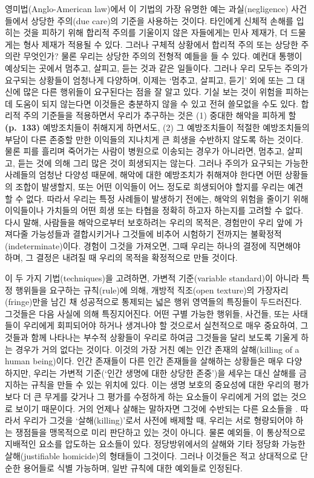 영미법(Anglo-American law)에서 이 기법의 가장 유명한 예는
과실(negligence) 사건들에서 상당한 주의(due care)의 기준을 사용하는
것이다. 타인에게 신체적 손해를 입히는 것을 피하기 위해 합리적 주의를
기울이지 않은 자들에게는 민사 제재가, 더 드물게는 형사 제재가 적용될 수
있다. 그러나 구체적 상황에서 합리적 주의 또는 상당한 주의란 무엇인가?
물론 우리는 상당한 주의의 전형적 예들을 들 수 있다. 예컨대 통행이
예상되는 곳에서 멈추고, 살피고, 듣는 것과 같은 일들이다. 그러나 우리
모두는 주의가 요구되는 상황들이 엄청나게 다양하며, 이제는 ‘멈추고,
살피고, 듣기’ 외에 또는 그 대신에 많은 다른 행위들이 요구된다는 점을 잘
알고 있다. 기실 보는 것이 위험을 피하는 데 도움이 되지 않는다면 이것들은
충분하지 않을 수 있고 전혀 쓸모없을 수도 있다. 합리적 주의 기준들을
적용하면서 우리가 추구하는 것은 (1) 중대한 해악을 피하게 할
\textbf{(p.~133)} 예방조치들이 취해지게 하면서도, (2) 그 예방조치들이
적절한 예방조치들의 부담이 다른 존중할 만한 이익들의 지나치게 큰 희생을
수반하지 않도록 하는 것이다. 물론 피를 흘리며 죽어가는 사람이 병원으로
이송되는 경우가 아니라면, 멈추고, 살피고, 듣는 것에 의해 그리 많은 것이
희생되지는 않는다. 그러나 주의가 요구되는 가능한 사례들의 엄청난 다양성
때문에, 해악에 대한 예방조치가 취해져야 한다면 어떤 상황들의 조합이
발생할지, 또는 어떤 이익들이 어느 정도로 희생되어야 할지를 우리는
 예견할 수 없다. 따라서 우리는 특정 사례들이
발생하기 전에는, 해악의 위험을 줄이기 위해 이익들이나 가치들의 어떤 희생
또는 타협을 정확히 하고자 하는지를 고려할 수 없다. 다시 말해, 사람들을
해악으로부터 보호하려는 우리의 목적은, 경험만이 우리 앞에 가져다줄
가능성들과 결합시키거나 그것들에 비추어 시험하기 전까지는
불확정적(indeterminate)이다. 경험이 그것을 가져오면, 그때 우리는 하나의
결정에 직면해야 하며, 그 결정은 내려질 때 우리의 목적을  확정적으로 만들 것이다.

이 두 가지 기법(techniques)을 고려하면, 가변적 기준(variable standard)이
아니라 특정 행위들을 요구하는 규칙(rule)에 의해, 개방적 직조(open
texture)의 가장자리(fringe)만을 남긴 채 
성공적으로 통제되는 넓은 행위 영역들의 특징들이 두드러진다. 그것들은
다음 사실에 의해 특징지어진다. 어떤 구별 가능한 행위들, 사건들, 또는
사태들이 우리에게 회피되어야 하거나 생겨나야 할 것으로서 실천적으로 매우
중요하여, 그것들과 함께 나타나는 부수적 상황들이 우리로 하여금 그것들을
달리 보도록 기울게 하는 경우가 거의 없다는 것이다. 이것의 가장 거친 예는
인간 존재의 살해(killing of a human being)이다. 인간 존재들이 다른 인간
존재들을 살해하는 상황들은 매우 다양하지만, 우리는 가변적 기준(‘인간
생명에 대한 상당한 존중’)을 세우는 대신 살해를 금지하는 규칙을 만들 수
있는 위치에 있다. 이는 생명 보호의 중요성에 대한 우리의 평가보다 더 큰
무게를 갖거나 그 평가를 수정하게 하는 요소들이 우리에게 거의 없는 것으로
보이기 때문이다. 거의 언제나 살해는 말하자면 그것에 수반되는 다른
요소들을 . 따라서 우리가 그것을
‘살해(killing)’로서 사전에 배제할 때, 우리는 서로 형량되어야 하는
쟁점들을 맹목적으로 미리 판단하고 있는 것이 아니다. 물론 예외들, 이
통상적으로 지배적인 요소를 압도하는 요소들이 있다. 정당방위에서의 살해와
기타 정당화 가능한 살해(justifiable homicide)의 형태들이 그것이다.
그러나 이것들은 적고 상대적으로 단순한 용어들로 식별 가능하며, 일반
규칙에 대한 예외들로 인정된다.

